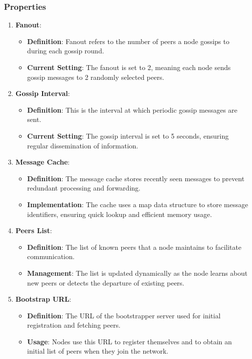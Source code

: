 \subsubsection{Properties}
\begin{enumerate}
    \item \textbf{Fanout}:
    \begin{itemize}
        \item \textbf{Definition}: Fanout refers to the number of peers a node gossips to during each gossip round.
        \item \textbf{Current Setting}: The fanout is set to 2, meaning each node sends gossip messages to 2 randomly selected peers.
    \end{itemize}
    \item \textbf{Gossip Interval}:
    \begin{itemize}
        \item \textbf{Definition}: This is the interval at which periodic gossip messages are sent.
        \item \textbf{Current Setting}: The gossip interval is set to 5 seconds, ensuring regular dissemination of information.
    \end{itemize}
    \item \textbf{Message Cache}:
    \begin{itemize}
        \item \textbf{Definition}: The message cache stores recently seen messages to prevent redundant processing and forwarding.
        \item \textbf{Implementation}: The cache uses a map data structure to store message identifiers, ensuring quick lookup and efficient memory usage.
    \end{itemize}
    \item \textbf{Peers List}:
    \begin{itemize}
        \item \textbf{Definition}: The list of known peers that a node maintains to facilitate communication.
        \item \textbf{Management}: The list is updated dynamically as the node learns about new peers or detects the departure of existing peers.
    \end{itemize}
    \item \textbf{Bootstrap URL}:
    \begin{itemize}
        \item \textbf{Definition}: The URL of the bootstrapper server used for initial registration and fetching peers.
        \item \textbf{Usage}: Nodes use this URL to register themselves and to obtain an initial list of peers when they join the network.
    \end{itemize}
\end{enumerate}





